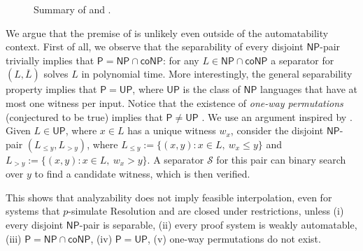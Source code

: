 \begin{figure}[t]
{
    }

    \caption{Summary of  and .}
\end{figure}

We argue that the premise of  is unlikely even outside of the automatability context. First of all, we observe that the separability of every disjoint $\mathsf{NP}$-pair trivially implies that $\mathsf{P}=\mathsf{NP}\cap\mathsf{coNP}$: for any $L\in\mathsf{NP}\cap\mathsf{coNP}$ a separator for $(L, \overline{L})$ solves $L$ in polynomial time. More interestingly, the general separability property implies that $\mathsf{P}=\mathsf{UP}$, where $\mathsf{UP}$ is the class of $\mathsf{NP}$ languages that have at most one witness per input. Notice that the existence of \textit{one-way permutations} (conjectured to be true) implies that $\mathsf{P}\neq\mathsf{UP}$ \cite{UP}. We use an argument inspired by \textcite{UP, UP_2}. Given $L \in \mathsf{UP}$, where $x\in L$ has a unique witness $w_x$, consider the disjoint $\mathsf{NP}$-pair $(L_{\leq y}, L_{> y})$, where $L_{\leq y} := \{(x,y):x\in L,\ w_x\le y\}$ and $L_{> y} := \{(x,y):x\in L,\ w_x > y\}$. A separator $\mathcal{S}$ for this pair can binary search over $y$ to find a candidate witness, which is then verified.

This shows that analyzability does not imply feasible interpolation, even for systems that $p$-simulate Resolution and are closed under restrictions, unless (i) every disjoint $\mathsf{NP}$-pair is separable, (ii) every proof system is weakly automatable, (iii) $\mathsf{P} = \mathsf{NP} \cap \mathsf{coNP}$, (iv) $\mathsf{P} = \mathsf{UP}$, (v) one-way permutations do not exist.